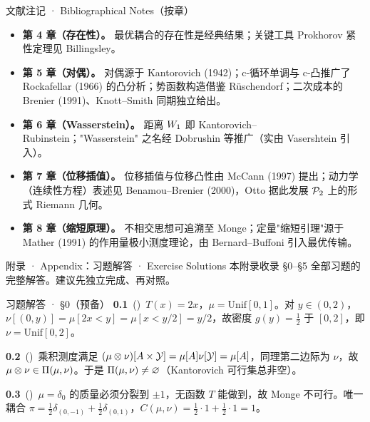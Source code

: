 \begin{frame}{文献注记 · Bibliographical Notes（按章）}
  \begin{itemize}\small
    \item \textbf{第 4 章（存在性）。} 最优耦合的存在性是经典结果；关键工具 Prokhorov 紧性定理见 Billingsley。
    \item \textbf{第 5 章（对偶）。} 对偶源于 Kantorovich (1942)；c-循环单调与 c-凸推广了 Rockafellar (1966) 的凸分析；势函数构造借鉴 Rüschendorf；二次成本的 Brenier (1991)、Knott--Smith 同期独立给出。
    \item \textbf{第 6 章（Wasserstein）。} 距离 $W_{1}$ 即 Kantorovich--Rubinstein；"Wasserstein" 之名经 Dobrushin 等推广（实由 Vasershtein 引入）。
    \item \textbf{第 7 章（位移插值）。} 位移插值与位移凸性由 McCann (1997) 提出；动力学（连续性方程）表述见 Benamou--Brenier (2000)，Otto 据此发展 $\mathcal{P}_{2}$ 上的形式 Riemann 几何。
    \item \textbf{第 8 章（缩短原理）。} 不相交思想可追溯至 Monge；定量"缩短引理"源于 Mather (1991) 的作用量极小测度理论，由 Bernard--Buffoni 引入最优传输。
  \end{itemize}
\end{frame}

\appendix

\begin{frame}{附录 · Appendix：习题解答 · Exercise Solutions}
  本附录收录 §0--§5 全部习题的完整解答。建议先独立完成、再对照。
\end{frame}

\begin{frame}{习题解答 · §0（预备）}
  \textbf{0.1}~(\diffI)\ $T(x)=2x$，$\mu=\mathrm{Unif}[0,1]$。对 $y\in(0,2)$，$\nu[(0,y)]=\mu[2x<y]=\mu[x<y/2]=y/2$，故密度 $g(y)=\tfrac12$ 于 $[0,2]$，即 $\nu=\mathrm{Unif}[0,2]$。

  \medskip
  \textbf{0.2}~(\diffII)\ 乘积测度满足 $(\mu\otimes\nu)[A\times\mathcal{Y}]=\mu[A]\nu[\mathcal{Y}]=\mu[A]$，同理第二边际为 $\nu$，故 $\mu\otimes\nu\in\Pi(\mu,\nu)$。于是 $\Pi(\mu,\nu)\neq\varnothing$（Kantorovich 可行集总非空）。

  \medskip
  \textbf{0.3}~(\diffIII)\ $\mu=\delta_0$ 的质量必须分裂到 $\pm1$，无函数 $T$ 能做到，故 Monge 不可行。唯一耦合 $\pi=\tfrac12\delta_{(0,-1)}+\tfrac12\delta_{(0,1)}$，$C(\mu,\nu)=\tfrac12\cdot1+\tfrac12\cdot1=1$。

\end{frame}

